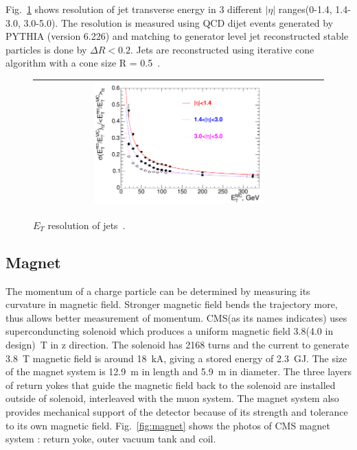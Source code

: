 Fig.~\ref{fig:hcal_res} shows resolution of jet transverse energy 
in 3 different $|\eta|$ ranges(0-1.4, 1.4-3.0, 3.0-5.0). 
The resolution is measured using QCD dijet events generated by PYTHIA (version 6.226)
and matching to generator level jet reconstructed stable particles is done by $\Delta R < 0.2$. 
Jets are reconstructed using iterative cone algorithm with a cone size R = 0.5~\cite{}. 
%
\begin{figure}[h] 
\vspace{1cm}
\centering 
\begin{tabular}{|c|} 
\hline
\includegraphics[width=0.6\textwidth]{figures/Figure_001-008.pdf}\\
\hline
\end{tabular} 
\caption{$E_T$ resolution of jets~\cite{cmstdr1}.}
\label{fig:hcal_res} 
\end{figure} 




\subsection{Magnet} 

The momentum of a charge particle can be determined by measuring 
its curvature in magnetic field. Stronger magnetic field bends   
the trajectory more, thus allows better measurement of momentum.
CMS(as its names indicates) uses superconduncting solenoid 
which produces a uniform magnetic field  3.8(4.0 in design)~T 
in z direction. %
The solenoid has 2168 turns and the current to generate 3.8~T magnetic field  
is around 18~kA, giving a stored energy of 2.3~GJ. 
The size of the magnet system is 12.9~m in length and 5.9~m in diameter. 
The three layers of return yokes that guide the magnetic field back to the solenoid 
are installed outside of solenoid, interleaved with the muon system. 
The magnet system also provides mechanical support of the detector
because of its strength and tolerance to its own magnetic field. 
Fig.~\ref{fig:magnet} shows the photos of CMS magnet system : 
return yoke, outer vacuum tank and coil. 

